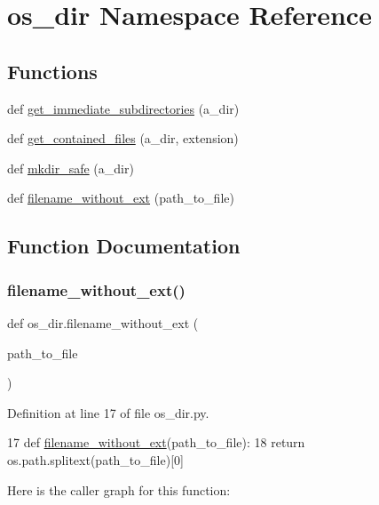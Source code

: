 \hypertarget{namespaceos__dir}{}\section{os\+\_\+dir Namespace Reference}
\label{namespaceos__dir}
\subsection*{Functions}
\begin{DoxyCompactItemize}
\item 
def \mbox{\hyperlink{namespaceos__dir_a7734a1131db0cd10af8ee0a4d9c5241d}{get\+\_\+immediate\+\_\+subdirectories}} (a\+\_\+dir)
\item 
def \mbox{\hyperlink{namespaceos__dir_adfd8c337f0778c2c6fe21892478f5357}{get\+\_\+contained\+\_\+files}} (a\+\_\+dir, extension)
\item 
def \mbox{\hyperlink{namespaceos__dir_ad1414a4868a8da9c6cd962203048d22c}{mkdir\+\_\+safe}} (a\+\_\+dir)
\item 
def \mbox{\hyperlink{namespaceos__dir_a504bf6aacc096b5c5a86495a7485007e}{filename\+\_\+without\+\_\+ext}} (path\+\_\+to\+\_\+file)
\end{DoxyCompactItemize}


\subsection{Function Documentation}
\mbox{\label{namespaceos__dir_a504bf6aacc096b5c5a86495a7485007e}} 
\subsubsection{\texorpdfstring{filename\+\_\+without\+\_\+ext()}{filename\_without\_ext()}}
{\footnotesize\ttfamily def os\+\_\+dir.\+filename\+\_\+without\+\_\+ext (\begin{DoxyParamCaption}\item[{}]{path\+\_\+to\+\_\+file }\end{DoxyParamCaption})}



Definition at line 17 of file os\+\_\+dir.\+py.


\begin{DoxyCode}
17 \textcolor{keyword}{def }\mbox{\hyperlink{namespaceos__dir_a504bf6aacc096b5c5a86495a7485007e}{filename\_without\_ext}}(path\_to\_file): 
18     \textcolor{keywordflow}{return} os.path.splitext(path\_to\_file)[0]
\end{DoxyCode}
Here is the caller graph for this function\+:
\mbox{\label{namespaceos__dir_adfd8c337f0778c2c6fe21892478f5357}} 
